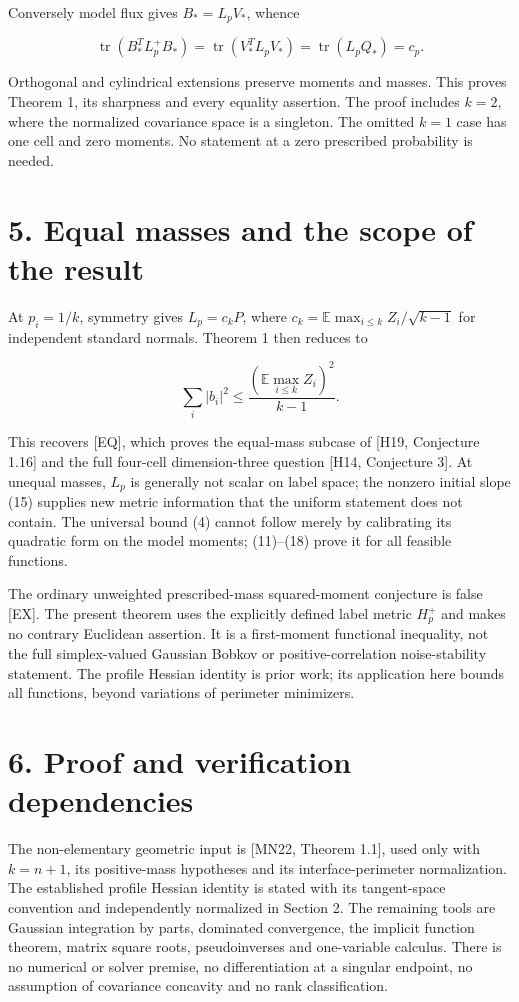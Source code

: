 \documentclass[
  11pt,
]{article}
\begin{document}
Conversely model flux gives \(B_*=L_pV_*\), whence

\[
 \operatorname{tr}(B_*^TL_p^+B_*)
         =\operatorname{tr}(V_*^TL_pV_*)
         =\operatorname{tr}(L_pQ_*)=c_p.
\]

Orthogonal and cylindrical extensions preserve moments and masses. This
proves Theorem 1, its sharpness and every equality assertion. The proof
includes \(k=2\), where the normalized covariance space is a singleton.
The omitted \(k=1\) case has one cell and zero moments. No statement at
a zero prescribed probability is needed.

\section{5. Equal masses and the scope of the
result}\label{equal-masses-and-the-scope-of-the-result}

At \(p_i=1/k\), symmetry gives \(L_p=c_kP\), where
\(c_k=\mathbb E\max_{i\le k}Z_i/\sqrt{k-1}\) for independent standard
normals. Theorem 1 then reduces to

\[
             \sum_i|b_i|^2\le
                   \frac{(\mathbb E\max_{i\le k}Z_i)^2}{k-1}.
\]

This recovers {[}EQ{]}, which proves the equal-mass subcase of {[}H19,
Conjecture 1.16{]} and the full four-cell dimension-three question
{[}H14, Conjecture 3{]}. At unequal masses, \(L_p\) is generally not
scalar on label space; the nonzero initial slope (15) supplies new
metric information that the uniform statement does not contain. The
universal bound (4) cannot follow merely by calibrating its quadratic
form on the model moments; (11)--(18) prove it for all feasible
functions.

The ordinary unweighted prescribed-mass squared-moment conjecture is
false {[}EX{]}. The present theorem uses the explicitly defined label
metric \(H_p^+\) and makes no contrary Euclidean assertion. It is a
first-moment functional inequality, not the full simplex-valued Gaussian
Bobkov or positive-correlation noise-stability statement. The profile
Hessian identity is prior work; its application here bounds all
functions, beyond variations of perimeter minimizers.

\section{6. Proof and verification
dependencies}\label{proof-and-verification-dependencies}

The non-elementary geometric input is {[}MN22, Theorem 1.1{]}, used only
with \(k=n+1\), its positive-mass hypotheses and its interface-perimeter
normalization. The established profile Hessian identity is stated with
its tangent-space convention and independently normalized in Section 2.
The remaining tools are Gaussian integration by parts, dominated
convergence, the implicit function theorem, matrix square roots,
pseudoinverses and one-variable calculus. There is no numerical or
solver premise, no differentiation at a singular endpoint, no assumption
of covariance concavity and no rank classification.
\end{document}
